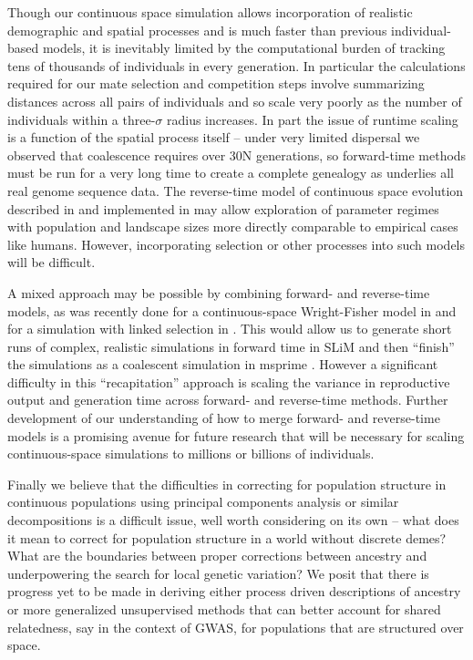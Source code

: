 \documentclass[11pt,twoside,lineno]{preprint}
\newif\ifcomments
\newcommand{\ak}[1]{\ifcomments{{\color{red} \it (#1)}}\else{}\fi}
\begin{document}
Though our continuous space simulation allows incorporation of realistic demographic and spatial processes and is much faster than previous individual-based models, it is inevitably limited by the computational burden of tracking tens of thousands of individuals in every generation. In particular the calculations required for our mate selection and competition steps involve summarizing distances across all pairs of individuals and so scale very poorly \ak{how exactly does this scale? $O(N^2)$?} as the number of individuals within a three-$\sigma$ radius increases. In part the issue of runtime scaling is a function of the spatial process itself -- under very limited dispersal we observed that coalescence requires over 30N generations, so forward-time methods must be run for a very long time to create a complete genealogy as underlies all real genome sequence data. The reverse-time model of continuous space evolution described in \cite{Barton2010} and implemented in \cite{Kelleher2014} may allow exploration of parameter regimes with population and landscape sizes more directly comparable to empirical cases like humans. However, incorporating selection or other processes into such models will be difficult. 

A mixed approach may be possible by combining forward- and reverse-time models, as was recently done for a continuous-space Wright-Fisher model in \cite{Lotterhos2019} and for a simulation with linked selection in \cite{Buffalo2019}. This would allow us to generate short runs of complex, realistic simulations in forward time in SLiM \citep{Haller2019} and then ``finish'' the simulations as a coalescent simulation in msprime \citep{Kelleher2016}. However a significant difficulty in this ``recapitation'' approach is scaling the variance in reproductive output and generation time across forward- and reverse-time methods. Further development of our understanding of how to merge forward- and reverse-time models is a promising avenue for future research that will be necessary for scaling continuous-space simulations to millions or billions of individuals.  

Finally we believe that the difficulties in correcting for population structure in continuous populations using principal components analysis or similar decompositions is a difficult issue, well worth considering on its own -- what does it mean to correct for population structure in a world without discrete demes? What are the boundaries between proper corrections between ancestry and underpowering the search for local genetic variation? We posit that there is progress yet to be made in deriving either process driven descriptions of ancestry or more generalized unsupervised methods that can better account for shared relatedness, say in the context of GWAS, for populations that are structured over space. 
\ak{this paragraph is a bit out there. rein me in}
\end{document}
